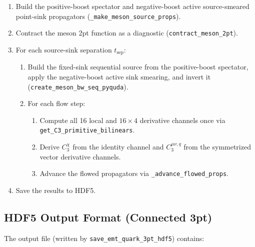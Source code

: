 \documentclass[11pt,a4paper]{article}
\newcommand{\code}[1]{\texttt{#1}}
\begin{document}
\begin{enumerate}[nosep]
  \item Build the positive-boost spectator and negative-boost active
        source-smeared point-sink propagators
        (\code{\_make\_meson\_source\_props}).
  \item Contract the meson 2pt function as a diagnostic (\code{contract\_meson\_2pt}).
  \item For each source-sink separation $t_{\text{sep}}$:
  \begin{enumerate}
    \item Build the fixed-sink sequential source from the positive-boost
          spectator, apply the negative-boost active sink smearing, and invert
          it (\code{create\_meson\_bw\_seq\_pyquda}).
    \item For each flow step:
    \begin{enumerate}
      \item Compute all 16 local and $16\times4$ derivative channels once via
            \code{get\_C3\_primitive\_bilinears}.
      \item Derive $C_3^\chi$ from the identity channel and
            $C_3^{\mu\nu,q}$ from the symmetrized vector derivative channels.
      \item Advance the flowed propagators via \code{\_advance\_flowed\_props}.
    \end{enumerate}
  \end{enumerate}
  \item Save the results to HDF5.
\end{enumerate}

\subsection{HDF5 Output Format (Connected 3pt)}
\label{sec:hdf5_3pt}

The output file (written by \code{save\_emt\_quark\_3pt\_hdf5}) contains:
\end{document}

